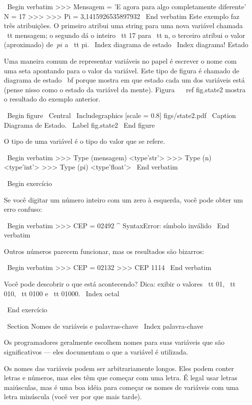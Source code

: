 \documentclass[10pt]{book}
\begin{document}
{\ Begin {verbatim}
>>> Mensagem = 'E agora para algo completamente diferente'
N = 17 >>>
>>> Pi = 3,1415926535897932
\ End {verbatim}
%
Este exemplo faz três atribuições. O primeiro atribui uma string
para uma nova variável chamada {\ tt mensagem};
o segundo dá o inteiro {\ tt 17} para {\ tt n}, o terceiro
atribui o valor (aproximado) de $ \ pi $ a {\ tt pi}.
\ Index {diagrama de estado}
\ Index {diagrama! Estado}

Uma maneira comum de representar variáveis ​​no papel é escrever o nome com
uma seta apontando para o valor da variável. Este tipo de figura é
chamado de diagrama de estado {\ bf} porque mostra em que estado cada um dos
variáveis ​​está (pense nisso como o estado da variável da mente).
Figura ~ \ ref {fig.state2} mostra o resultado do exemplo anterior.

\ Begin {figure}
\ Central
{\ Includegraphics [scale = 0.8] {figs/state2.pdf}}
\ Caption {Diagrama de Estado.}
\ Label {} fig.state2
\ End {figure}

O tipo de uma variável é o tipo do valor que se refere.

\ Begin {verbatim}
>>> Type (mensagem)
<type'str'>
>>> Type (n)
<type'int'>
>>> Type (pi)
<type'float'>
\ End {verbatim}

\ Begin {} exercício

Se você digitar um número inteiro com um zero à esquerda, você pode obter
um erro confuso:

\ Begin {verbatim}
>>> CEP = 02492
                  ^
SyntaxError: símbolo inválido
\ End {verbatim}

Outros números parecem funcionar, mas os resultados são bizarros:

\ Begin {verbatim}
>>> CEP = 02132
>>> CEP
1114
\ End {verbatim}

Você pode descobrir o que está acontecendo? Dica: exibir o
valores {\ tt 01}, {\ tt 010}, {\ tt 0100} e {\ tt 01000}.
\ Index {octal}

\ End {} exercício



\ Section {Nomes de variáveis ​​e palavras-chave}
\ Index {palavra-chave}

Os programadores geralmente escolhem nomes para suas variáveis ​​que
são significativos --- eles documentam o que a variável é utilizada.

Os nomes das variáveis ​​podem ser arbitrariamente longos. Eles podem conter
letras e números, mas eles têm que começar com uma letra.
É legal usar letras maiúsculas, mas é uma boa idéia
para começar os nomes de variáveis ​​com uma letra minúscula (você
ver por que mais tarde).

}
\end{document}
